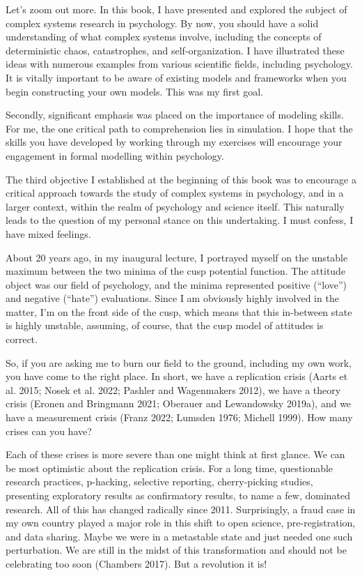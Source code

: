 \documentclass[
  a4paper,
  DIV=11,
  numbers=noendperiod]{scrreprt}
\begin{document}
Let's zoom out more. In this book, I have presented and explored the
subject of complex systems research in psychology. By now, you should
have a solid understanding of what complex systems involve, including
the concepts of deterministic chaos, catastrophes, and
self-organization. I have illustrated these ideas with numerous examples
from various scientific fields, including psychology. It is vitally
important to be aware of existing models and frameworks when you begin
constructing your own models. This was my first goal.

Secondly, significant emphasis was placed on the importance of modeling
skills. For me, the one critical path to comprehension lies in
simulation. I hope that the skills you have developed by working through
my exercises will encourage your engagement in formal modelling within
psychology.

The third objective I established at the beginning of this book was to
encourage a critical approach towards the study of complex systems in
psychology, and in a larger context, within the realm of psychology and
science itself. This naturally leads to the question of my personal
stance on this undertaking. I must confess, I have mixed feelings.

About 20 years ago, in my inaugural lecture, I portrayed myself on the
unstable maximum between the two minima of the cusp potential function.
The attitude object was our field of psychology, and the minima
represented positive (``love'') and negative (``hate'') evaluations.
Since I am obviously highly involved in the matter, I'm on the front
side of the cusp, which means that this in-between state is highly
unstable, assuming, of course, that the cusp model of attitudes is
correct.

So, if you are asking me to burn our field to the ground, including my
own work, you have come to the right place. In short, we have a
replication crisis (Aarts et al. 2015; Nosek et al. 2022; Pashler and
Wagenmakers 2012), we have a theory crisis (Eronen and Bringmann 2021;
Oberauer and Lewandowsky 2019a), and we have a measurement crisis (Franz
2022; Lumsden 1976; Michell 1999). How many crises can you have?

Each of these crises is more severe than one might think at first
glance. We can be most optimistic about the replication crisis. For a
long time, questionable research practices, p-hacking, selective
reporting, cherry-picking studies, presenting exploratory results as
confirmatory results, to name a few, dominated research. All of this has
changed radically since 2011. Surprisingly, a fraud case in my own
country played a major role in this shift to open science,
pre-registration, and data sharing. Maybe we were in a metastable state
and just needed one such perturbation. We are still in the midst of this
transformation and should not be celebrating too soon (Chambers 2017).
But a revolution it is!
\end{document}
